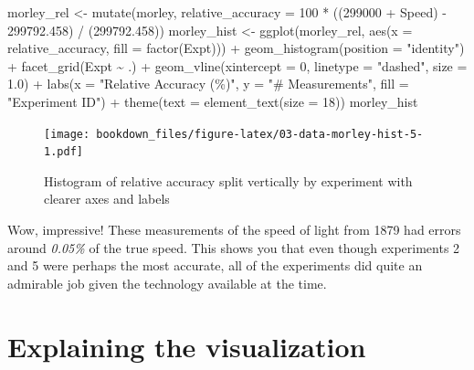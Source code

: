 \documentclass[
]{krantz}
\makeatletter
\newenvironment{Shaded}{\begin{snugshade}}{\end{snugshade}}
\newcommand{\AttributeTok}[1]{\textcolor[rgb]{0.61,0.61,0.61}{#1}}
\newcommand{\DecValTok}[1]{\textcolor[rgb]{0.06,0.06,0.06}{#1}}
\newcommand{\FloatTok}[1]{\textcolor[rgb]{0.06,0.06,0.06}{#1}}
\newcommand{\FunctionTok}[1]{\textcolor[rgb]{0,0,0}{#1}}
\newcommand{\NormalTok}[1]{#1}
\newcommand{\OtherTok}[1]{\textcolor[rgb]{0.37,0.37,0.37}{#1}}
\newcommand{\SpecialCharTok}[1]{\textcolor[rgb]{0,0,0}{#1}}
\newcommand{\StringTok}[1]{\textcolor[rgb]{0.5,0.5,0.5}{#1}}
\newenvironment{kframe}{%
\medskip{}
\setlength{\fboxsep}{.8em}
 \def\at@end@of@kframe{}%
 \ifinner\ifhmode%
  \def\at@end@of@kframe{\end{minipage}}%
  \begin{minipage}{\columnwidth}%
 \fi\fi%
 \def\FrameCommand##1{\hskip\@totalleftmargin \hskip-\fboxsep
 \colorbox{shadecolor}{##1}\hskip-\fboxsep
     \hskip-\linewidth \hskip-\@totalleftmargin \hskip\columnwidth}%
 \MakeFramed {\advance\hsize-\width
   \@totalleftmargin\z@ \linewidth\hsize
   \@setminipage}}%
 {\par\unskip\endMakeFramed%
 \at@end@of@kframe}
\renewenvironment{Shaded}{\begin{kframe}}{\end{kframe}}
\makeatother
\begin{document}
\begin{Shaded}
\begin{Highlighting}[]
\NormalTok{morley\_rel }\OtherTok{\textless{}{-}} \FunctionTok{mutate}\NormalTok{(morley, }\AttributeTok{relative\_accuracy =} \DecValTok{100} \SpecialCharTok{*}\NormalTok{ ((}\DecValTok{299000} \SpecialCharTok{+}\NormalTok{ Speed) }\SpecialCharTok{{-}} \FloatTok{299792.458}\NormalTok{) }\SpecialCharTok{/}\NormalTok{ (}\FloatTok{299792.458}\NormalTok{))}
\NormalTok{morley\_hist }\OtherTok{\textless{}{-}} \FunctionTok{ggplot}\NormalTok{(morley\_rel, }\FunctionTok{aes}\NormalTok{(}\AttributeTok{x =}\NormalTok{ relative\_accuracy, }\AttributeTok{fill =} \FunctionTok{factor}\NormalTok{(Expt))) }\SpecialCharTok{+}
  \FunctionTok{geom\_histogram}\NormalTok{(}\AttributeTok{position =} \StringTok{"identity"}\NormalTok{) }\SpecialCharTok{+}
  \FunctionTok{facet\_grid}\NormalTok{(Expt }\SpecialCharTok{\textasciitilde{}}\NormalTok{ .) }\SpecialCharTok{+}
  \FunctionTok{geom\_vline}\NormalTok{(}\AttributeTok{xintercept =} \DecValTok{0}\NormalTok{, }\AttributeTok{linetype =} \StringTok{"dashed"}\NormalTok{, }\AttributeTok{size =} \FloatTok{1.0}\NormalTok{) }\SpecialCharTok{+}
  \FunctionTok{labs}\NormalTok{(}\AttributeTok{x =} \StringTok{"Relative Accuracy (\%)"}\NormalTok{, }\AttributeTok{y =} \StringTok{"\# Measurements"}\NormalTok{, }\AttributeTok{fill =} \StringTok{"Experiment ID"}\NormalTok{) }\SpecialCharTok{+}
  \FunctionTok{theme}\NormalTok{(}\AttributeTok{text =} \FunctionTok{element\_text}\NormalTok{(}\AttributeTok{size =} \DecValTok{18}\NormalTok{))}
\NormalTok{morley\_hist}
\end{Highlighting}
\end{Shaded}

\begin{figure}
\centering
\texttt{[image: bookdown\_files/figure-latex/03-data-morley-hist-5-1.pdf]}
\caption{\label{fig:03-data-morley-hist-5}Histogram of relative accuracy split vertically by experiment with clearer axes and labels}
\end{figure}

Wow, impressive! These measurements of the speed of light from 1879 had errors around \emph{0.05\%} of the true speed. This shows
you that even though experiments 2 and 5 were perhaps the most accurate, all of the experiments did quite an
admirable job given the technology available at the time.

\hypertarget{explaining-the-visualization}{%
\section{Explaining the visualization}\label{explaining-the-visualization}}
\end{document}
